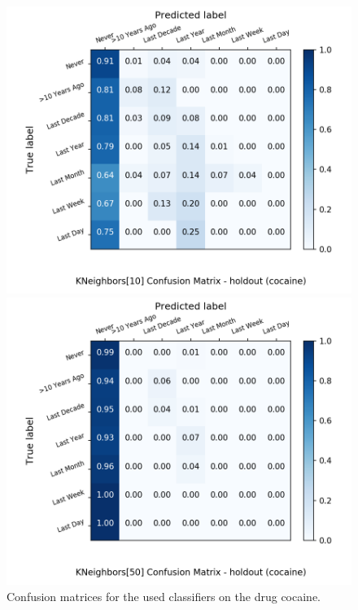 \begin{figure}[H]
\begin{minipage}[b]{0.32\textwidth}
		\includegraphics[width=1.1\textwidth]{Plots/cocaine_KNeighbors_10_balance_False_holdout.png}
  \end{minipage}
	\begin{minipage}[b]{0.32\textwidth}
		\includegraphics[width=1.1\textwidth]{Plots/cocaine_KNeighbors_50_balance_False_holdout.png}
  \end{minipage}
	\caption{Confusion matrices for the used classifiers on the drug cocaine.}
\end{figure}

